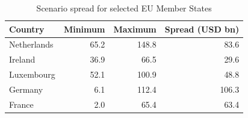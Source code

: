 \begin{table}[H]
\centering
\caption{Scenario spread for selected EU Member States}
\label{tab:stage4_6_country_spread_generated}
\small
\begin{tabular}{@{}lrrr@{}}
\toprule
Country & Minimum & Maximum & Spread (USD bn) \\
\midrule
Netherlands & 65.2 & 148.8 & 83.6 \\
Ireland & 36.9 & 66.5 & 29.6 \\
Luxembourg & 52.1 & 100.9 & 48.8 \\
Germany & 6.1 & 112.4 & 106.3 \\
France & 2.0 & 65.4 & 63.4 \\
\bottomrule
\end{tabular}
\end{table}
